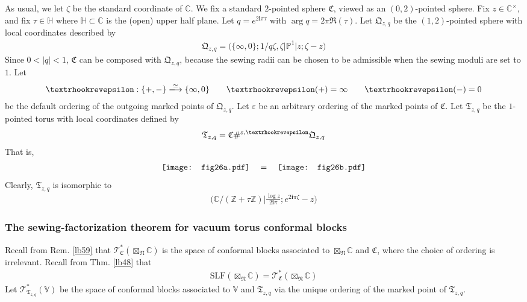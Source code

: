 \documentclass[11pt,b5paper,notitlepage]{article}
\theoremstyle{definition}
\theoremstyle{plain}
\newcommand{\fk}{\mathfrak}
\newcommand{\im}{\mathbf{i}}
\newcommand{\SLF}{\mathrm{SLF}}
\newcommand{\mbb}{\mathbb}
\newcommand{\Vbb}{\mathbb V}
\newcommand{\Cbb}{\mathbb C}
\newcommand{\Zbb}{\mathbb Z}
\newcommand{\Pbb}{\mathbb P}
\newcommand{\<}{\left\langle}
\renewcommand{\>}{\right\rangle}
\newcommand{\ST}{\mathscr{T}}
\newcommand{\fc}{\mathfrak{C}}
\newcommand{\fq}{{\mathfrak Q}}
\newcommand{\ft}{{\mathfrak T}}
\newcommand{\eps}{\varepsilon}
\newcommand{\fn}{\mathfrak{N}}
\newcommand{\tipae}{\text{\textrhookrevepsilon}}
\numberwithin{equation}{section}
\begin{document}
As usual, we let $\zeta$ be the standard coordinate of $\Cbb$. We fix a standard $2$-pointed sphere $\fk C$, viewed as an $(0,2)$-pointed sphere. Fix $z\in\Cbb^\times$, and fix $\tau\in\mbb H$ where $\mbb H\subset\Cbb$ is the (open) upper half plane. Let $q=e^{2\im\pi\tau}$ with $\arg q=2\pi\Re(\tau)$. Let $\fq_{z,q}$ be the $(1,2)$-pointed sphere with local coordinates described by
\begin{align*}
\fq_{z,q}=\big(\{\infty,0\};1/q\zeta,\zeta\big|\Pbb^1\big|z;\zeta-z\big)
\end{align*}
Since $0<|q|<1$, $\fc$ can be composed with $\fq_{z,q}$, because the sewing radii can be chosen to be admissible when the sewing moduli are set to $1$. Let
\begin{align}
\tipae:\{+,-\}\xlongrightarrow{\simeq}\{\infty,0\}\qquad \tipae(+)=\infty\qquad \tipae(-)=0
\end{align} 
be the default ordering of the outgoing marked points of $\fq_{z,q}$. Let $\eps$ be an arbitrary ordering of the marked points of $\fc$. Let $\fk T_{z,q}$ be the $1$-pointed torus with local coordinates defined by
\begin{align*}
\fk T_{z,q}=\fc\#^{\eps,\tipae}\fq_{z,q}
\end{align*}
That is,
\begin{align*}
\vcenter{\hbox{{\texttt{[image: fig26a.pdf]}}}}\quad=\quad \vcenter{\hbox{{\texttt{[image: fig26b.pdf]}}}}
\end{align*}
Clearly, $\fk T_{z,q}$ is isomorphic to
\begin{align*}
\Big(\Cbb/(\Zbb+\tau\Zbb)\Big|\frac{\log z}{2\im\pi};e^{2\im\pi\zeta}-z \Big)
\end{align*}




\subsubsection{The sewing-factorization theorem for vacuum torus conformal blocks}

Recall from Rem. \ref{lb59} that $\ST^*_\fc(\boxtimes_\fn\Cbb)$ is the space of conformal blocks associated to $\boxtimes_\fn\Cbb$ and $\fc$, where the choice of ordering is irrelevant. Recall from Thm. \ref{lb48} that
\begin{align*}
\SLF(\boxtimes_\fn\Cbb)=\ST^*_{\fk C}(\boxtimes_\fn\Cbb)
\end{align*}
Let $\ST^*_{\ft_{z,q}}(\Vbb)$ be the space of conformal blocks associated to $\Vbb$ and $\ft_{z,q}$ via the unique ordering of the marked point of $\ft_{z,q}$. 
\end{document}
